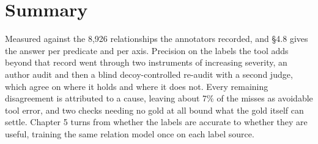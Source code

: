 \section{Summary}

Measured against the 8,926 relationships the annotators recorded, and \S{}4.8 gives the answer per predicate and per axis. Precision on the labels the tool adds beyond that record went through two instruments of increasing severity, an author audit and then a blind decoy-controlled re-audit with a second judge, which agree on where it holds and where it does not. Every remaining disagreement is attributed to a cause, leaving about 7\% of the misses as avoidable tool error, and two checks needing no gold at all bound what the gold itself can settle. Chapter 5 turns from whether the labels are accurate to whether they are useful, training the same relation model once on each label source.